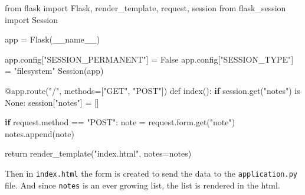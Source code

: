 \documentclass[]{book}
\newenvironment{Shaded}{\begin{snugshade}}{\end{snugshade}}
\newcommand{\KeywordTok}[1]{\textcolor[rgb]{0.13,0.29,0.53}{\textbf{#1}}}
\newcommand{\StringTok}[1]{\textcolor[rgb]{0.31,0.60,0.02}{#1}}
\newcommand{\BuiltInTok}[1]{#1}
\newcommand{\ExtensionTok}[1]{#1}
\newcommand{\NormalTok}[1]{#1}
\begin{document}
\begin{Shaded}
\begin{Highlighting}[]
\ExtensionTok{from}\NormalTok{ flask import Flask, render_template, request, session}
\ExtensionTok{from}\NormalTok{ flask_session import Session                         }
                                                          
\ExtensionTok{app}\NormalTok{ = Flask(__name__)                                     }
                                                          
\ExtensionTok{app.config}\NormalTok{[}\StringTok{"SESSION_PERMANENT"}\NormalTok{] = False                   }
\ExtensionTok{app.config}\NormalTok{[}\StringTok{"SESSION_TYPE"}\NormalTok{] = }\StringTok{"filesystem"}                 
\ExtensionTok{Session}\NormalTok{(app)                                              }
                                                          
\ExtensionTok{@app.route}\NormalTok{(}\StringTok{"/"}\NormalTok{, methods=[}\StringTok{"GET"}\NormalTok{, }\StringTok{"POST"}\NormalTok{])                  }
\ExtensionTok{def}\NormalTok{ index()}\BuiltInTok{:}                                              
    \KeywordTok{if} \ExtensionTok{session.get}\NormalTok{(}\StringTok{"notes"}\NormalTok{) }\ExtensionTok{is}\NormalTok{ None:}
        \ExtensionTok{session}\NormalTok{[}\StringTok{"notes"}\NormalTok{] = []       }

    \KeywordTok{if} \ExtensionTok{request.method}\NormalTok{ == }\StringTok{"POST"}\NormalTok{:                          }
        \ExtensionTok{note}\NormalTok{ = request.form.get(}\StringTok{"note"}\NormalTok{)                   }
        \ExtensionTok{notes.append}\NormalTok{(note)                                }
                                                          
    \BuiltInTok{return}\NormalTok{ render_template(}\StringTok{"index.html"}\NormalTok{, notes=notes)     }
\end{Highlighting}
\end{Shaded}

Then in \texttt{index.html} the form is created to send the data to the
\texttt{application.py} file. And since \texttt{notes} is an ever
growing list, the list is rendered in the html.
\end{document}
